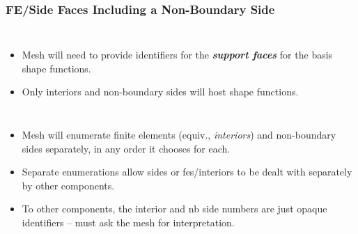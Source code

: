 \documentclass{beamer}
\begin{document}
\begin{frame}
  \frametitle{FE/Side Faces Including a Non-Boundary Side}
  \begin{columns}
      \begin{itemize}[<+->]
        \item Mesh will need to provide identifiers for the \emph{\textbf{support faces}} for the basis shape functions.
        \item Only interiors and non-boundary sides will host shape functions.
      \end{itemize}
       {}
               {}
  \end{columns}
  \begin{itemize}[<+->]
    \item Mesh will enumerate finite elements (equiv., \emph{interiors}) and non-boundary sides separately, in any order it chooses for each.
    \item Separate enumerations allow sides or fes/interiors to be dealt with separately by other components.
    \item To other components, the interior and nb side numbers are just opaque identifiers -- must ask the mesh for interpretation.
  \end{itemize}
\end{frame}


\end{document}

